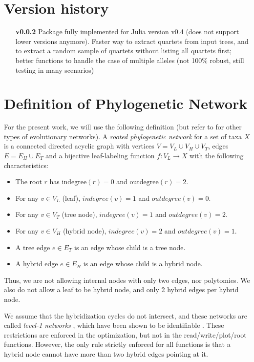 \documentclass[12pt]{article}
\begin{document}
\section{Version history}

\begin{itemize}
\item[\textbf{v0.0.2}]{Package fully implemented for Julia version v0.4 (does
    not support lower versions anymore). Faster way to extract quartets from
    input trees, and to extract a random sample of quartets without
    listing all quartets first; better functions to handle the case of
    multiple alleles (not 100\% robust, still testing in many
    scenarios)}
\end{itemize}





\appendix
\section{Definition of Phylogenetic Network}

For the present work, we will use the following definition (but refer
to \citet{Huson2010} for other types of evolutionary networks).
A \textit{rooted phylogenetic network} for a set of taxa $X$ is a
connected directed acyclic graph with vertices $V=V_L \cup V_H \cup
V_T$, edges $E=E_H \cup E_T$ and a bijective leaf-labeling function
$f:V_L \rightarrow X$ with the following characteristics:
\begin{itemize}
\item The root $r$ has $\mathrm{indegree}(r)=0$ and $\mathrm{outdegree}(r)=2$.
\item{For any $v \in V_L$ (leaf), $indegree(v)=1$ and
    $outdegree(v)=0$.}
\item{For any $v \in V_T$ (tree node), $indegree(v)=1$ and $outdegree(v)=2$.}
\item{For any $v \in V_H$ (hybrid node), $indegree(v)=2$ and $outdegree(v)=1$.}
\item{A tree edge $e \in E_T$ is an edge whose child is a tree node.}
\item{A hybrid edge $e \in E_H$ is an edge whose child is a hybrid node.}
\end{itemize}
Thus, we are not allowing internal nodes with only two edges, nor
polytomies. We also do not allow a leaf to be hybrid node, and only 2
hybrid edges per hybrid node.

We assume that the hybridization cycles do not intersect, and these
networks are called \textit{level-1 networks} \citep{Huson2010}, which
have been shown to be identifiable \citep{Pardi2015,Solis-Lemus2015}.
These restrictions are enforced in the optimization, but not in the
read/write/plot/root functions. However, the only rule strictly
enforced for all functions is that a hybrid node cannot have more than
two hybrid edges pointing at it.
\end{document}
